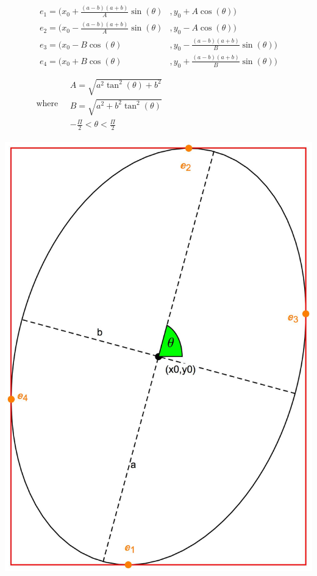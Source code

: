 \begin{minipage}{0.7\textwidth}
\begin{align*}
\begin{array}{ll}
e_1= \Bigg( x_0+\frac{(a-b) (a+b) }{A} \sin \left( \theta \right) & , y_0+A \cos \left( \theta \right) \Bigg)\\
e_2=  \Bigg( x_0-\frac{(a-b) (a+b)}{A} \sin \left( \theta \right) & , y_0-A \cos \left( \theta \right) \Bigg)\\
e_3=  \Bigg( x_0-B \cos \left( \theta \right)  & , y_0-\frac{(a-b) (a+b) }{B} \sin \left( \theta \right) \Bigg)\\
e_4=  \Bigg( x_0+B \cos \left( \theta \right)  & , y_0+\frac{(a-b) (a+b) }{B} \sin \left( \theta \right) \Bigg)\\
\end{array} \\
 \text{where}\quad 
\begin{array}{c}
A=\sqrt{a^2 \tan ^2(\theta )+b^2} \\
B=\sqrt{a^2+b^2 \tan ^2(\theta )} \\
-\frac{\Pi}{2}< \theta < \frac{\Pi}{2}
\end{array}
\end{align*}
\end{minipage}%
\begin{minipage}{0.3\textwidth}
 \includegraphics[width=\textwidth]{Chapter4/Figs/Elliptical_Bounds.jpg}
\end{minipage}


